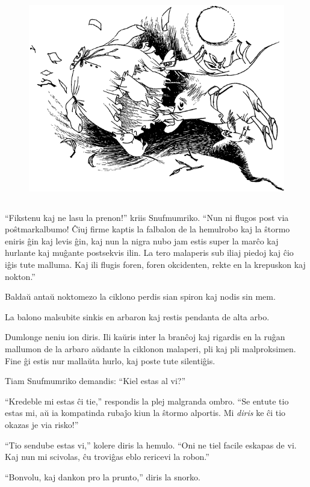 \begin{figure}[htbp]
\centering
\includegraphics[width=350pt,height=255pt]{8-8.png}
\caption{}
\label{8-8}
\end{figure}

``Fikstenu kaj ne lasu la prenon!'' kriis Snufmumriko. ``Nun ni flugos post via poŝtmarkalbumo! Ĉiuj firme kaptis la falbalon de la hemulrobo kaj la ŝtormo eniris ĝin kaj levis ĝin, kaj nun la nigra nubo jam estis super la marĉo kaj hurlante kaj muĝante postsekvis ilin. La tero malaperis sub iliaj piedoj kaj ĉio iĝis tute malluma. Kaj ili flugis foren, foren okcidenten, rekte en la krepuskon kaj nokton.''

\sectionbreak

Baldaŭ antaŭ noktomezo la ciklono perdis sian spiron kaj nodis sin mem.

La balono malsubite sinkis en arbaron kaj restis pendanta de alta arbo.

Dumlonge neniu ion diris. Ili kaŭris inter la branĉoj kaj rigardis en la ruĝan mallumon de la arbaro aŭdante la ciklonon malaperi, pli kaj pli malproksimen. Fine ĝi estis nur mallaŭta hurlo, kaj poste tute silentiĝis.

Tiam Snufmumriko demandis: ``Kiel estas al vi?''

``Kredeble mi estas ĉi tie,'' respondis la plej malgranda ombro. ``Se entute tio estas mi, aŭ ia kompatinda rubaĵo kiun la ŝtormo alportis. Mi \emph{diris} ke ĉi tio okazas je via risko!''

``Tio sendube estas vi,'' kolere diris la hemulo. ``Oni ne tiel facile eskapas de vi. Kaj nun mi scivolas, ĉu troviĝas eblo rericevi la robon.''

``Bonvolu, kaj dankon pro la prunto,'' diris la snorko.

